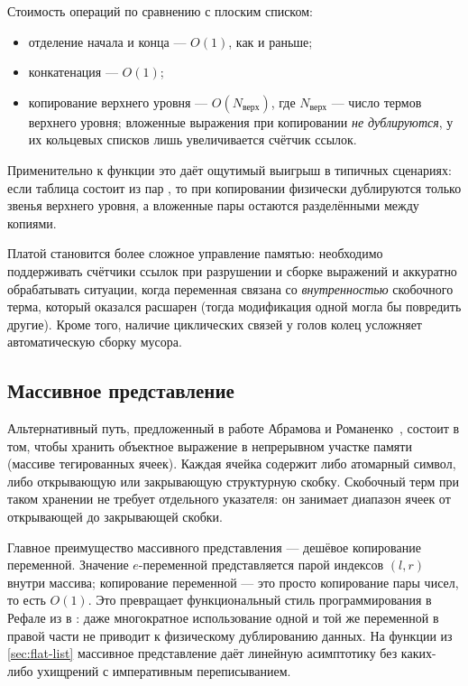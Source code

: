 Стоимость операций по сравнению с плоским списком:

\begin{itemize}
  \item отделение начала и конца --- \(O(1)\), как и раньше;
  \item конкатенация --- \(O(1)\);
  \item копирование верхнего уровня --- \(O(N_{\text{верх}})\),
        где \(N_{\text{верх}}\) --- число термов верхнего уровня;
        вложенные выражения при копировании \emph{не дублируются}, у их
        кольцевых списков лишь увеличивается счётчик ссылок.
\end{itemize}

Применительно к функции  это даёт ощутимый выигрыш в
типичных сценариях: если таблица состоит из пар ,
то при копировании  физически дублируются только звенья
верхнего уровня, а вложенные пары остаются разделёнными между копиями.

Платой становится более сложное управление памятью: необходимо
поддерживать счётчики ссылок при разрушении и сборке выражений и аккуратно
обрабатывать ситуации, когда переменная связана со \emph{внутренностью}
скобочного терма, который оказался расшарен (тогда модификация одной
 могла бы повредить другие). Кроме того, наличие циклических
связей у голов колец усложняет автоматическую сборку мусора.

\subsection{Массивное представление}
\label{sec:array-repr}

Альтернативный путь, предложенный в работе Абрамова и
Романенко~\cite{abramov_romanenko_1988}, состоит в том, чтобы хранить
объектное выражение в непрерывном участке памяти (массиве
тегированных ячеек). Каждая ячейка содержит либо атомарный символ, либо
открывающую или закрывающую структурную скобку. Скобочный терм при таком
хранении не требует отдельного указателя: он занимает диапазон ячеек от
открывающей до закрывающей скобки.

Главное преимущество массивного представления --- дешёвое копирование
переменной. Значение \(e\)-переменной  представляется парой
индексов \((l, r)\) внутри массива; копирование переменной --- это просто
копирование пары чисел, то есть \(O(1)\). Это превращает функциональный
стиль программирования в Рефале из  в : даже
многократное использование одной и той же переменной в правой части не
приводит к физическому дублированию данных. На функции  из
\ref{sec:flat-list} массивное представление даёт линейную асимптотику без
каких-либо ухищрений с императивным переписыванием.

